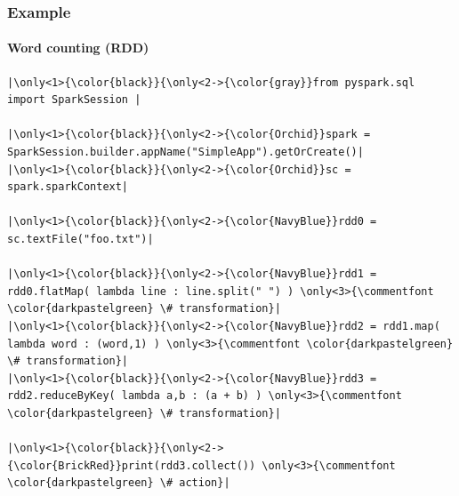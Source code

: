 \documentclass[aspectratio=169,dvipsnames]{beamer}
\begin{document}
    \begin{frame}[fragile]
        \frametitle{Example}
        \framesubtitle{Word counting (RDD)}
        \begin{center}

        \begin{minipage}{0.8\textwidth}
\begin{lstlisting}[escapechar={|}, title=wordcount.py]
|\only<1>{\color{black}}{\only<2->{\color{gray}}from pyspark.sql import SparkSession |

|\only<1>{\color{black}}{\only<2->{\color{Orchid}}spark = SparkSession.builder.appName("SimpleApp").getOrCreate()|
|\only<1>{\color{black}}{\only<2->{\color{Orchid}}sc = spark.sparkContext|

|\only<1>{\color{black}}{\only<2->{\color{NavyBlue}}rdd0 = sc.textFile("foo.txt")|

|\only<1>{\color{black}}{\only<2->{\color{NavyBlue}}rdd1 = rdd0.flatMap( lambda line : line.split(" ") ) \only<3>{\commentfont \color{darkpastelgreen} \# transformation}|
|\only<1>{\color{black}}{\only<2->{\color{NavyBlue}}rdd2 = rdd1.map( lambda word : (word,1) ) \only<3>{\commentfont \color{darkpastelgreen} \# transformation}| 
|\only<1>{\color{black}}{\only<2->{\color{NavyBlue}}rdd3 = rdd2.reduceByKey( lambda a,b : (a + b) ) \only<3>{\commentfont \color{darkpastelgreen} \# transformation}|

|\only<1>{\color{black}}{\only<2->{\color{BrickRed}}print(rdd3.collect()) \only<3>{\commentfont \color{darkpastelgreen} \# action}|
\end{lstlisting}
\end{minipage}
\end{center}
    \end{frame}
\end{document}
